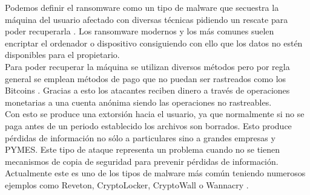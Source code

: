 Podemos definir el ransomware como un tipo de malware que secuestra la máquina del usuario afectado con diversas técnicas pidiendo un rescate para poder recuperarla \cite{definicion-ransomware-2}. Los ransomware modernos y los más comunes suelen encriptar el ordenador o dispositivo consiguiendo con ello que los datos no estén disponibles para el propietario.\\
Para poder recuperar la máquina se utilizan diversos métodos pero por regla general se emplean métodos de pago que no puedan ser rastreados como los Bitcoins \cite{definicion-ransomware-3}. Gracias a esto los atacantes reciben dinero a través de operaciones monetarias a una cuenta anónima siendo las operaciones no rastreables.\\
Con esto se produce una extorsión hacia el usuario, ya que normalmente si no se paga antes de un periodo establecido los archivos son borrados. Esto produce pérdidas de información no sólo a particulares sino a grandes empresas y PYMES. Este tipo de ataque representa un problema cuando no se tienen mecanismos de copia de seguridad para prevenir pérdidas de información. Actualmente este es uno de los tipos de malware más común teniendo numerosos ejemplos como Reveton, CryptoLocker, CryptoWall o Wannacry \cite{definicion-ransomware-4}.